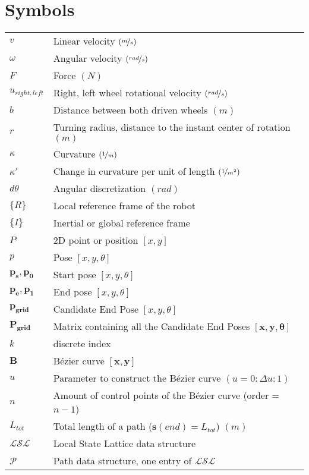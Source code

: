 \documentclass[oneside,english,master=wtk,inputenc="utf8"]{kulemt}
\newcommand{\nf}{\nicefrac}
\begin{document}
\section*{Symbols}
\begin{flushleft}
\renewcommand{\arraystretch}{1.1}
\begin{tabularx}{\textwidth}{@{}p{16mm}X@{}}
$v$					& Linear velocity $(\nf{m}{s})$ \\
$\omega$   	& Angular velocity $(\nf{rad}{s})$  \\
$F$					& Force $(N)$ \\
$u_{right,left}$ & Right, left wheel rotational velocity $(\nf{rad}{s})$ \\
$b$ 					& Distance between both driven wheels $(m)$ \\
$r$   				& Turning radius, distance to the instant center of rotation $(m)$\\
$\kappa$  		& Curvature $(\nf{1}{m})$ \\
$\kappa'$		& Change in curvature per unit of length $(\nf{1}{m^2})$ \\
$d\theta$		& Angular discretization $(rad)$ \\
$\{R\}$ 			& Local reference frame of the robot \\
$\{I\}$ 				& Inertial or global reference frame \\
$P$ 				& 2D point or position $[x, y]$ \\
${p}$				& Pose $[x,y,\theta]$ \\
$\bm{p_s},\bm{p_0}$ 	& Start pose $[x,y,\theta]$ \\
$\bm{p_e},\bm{p_1}$  	& End pose $[x,y,\theta]$ \\
$\bm{p_{grid}}$ & Candidate End Pose  $[x,y,\theta]$\\
$\bm{P_{grid}}$ & Matrix containing all the Candidate End Poses $[\bm{x},\bm{y},\bm{\theta}]$ \\
$k$					& discrete index \\
$\bm{B}$ 		& Bézier curve $[\bm{x}, \bm{y}]$\\
$u$					& Parameter to construct the Bézier curve $(u =0:\Delta u:1)$ \\
$n$					& Amount of control points of the Bézier curve (order = $n-1$) \\
$L_{tot}$		& Total length of a path ($\bm{s}(end)=L_{tot}$) $(m)$\\
$\mathcal{LSL}$ 	& Local State Lattice data structure\\
$\mathcal{P}$ 		& Path data structure, one entry of $\mathcal{LSL}$  \\

\end{tabularx}
\end{flushleft}
\end{document}
